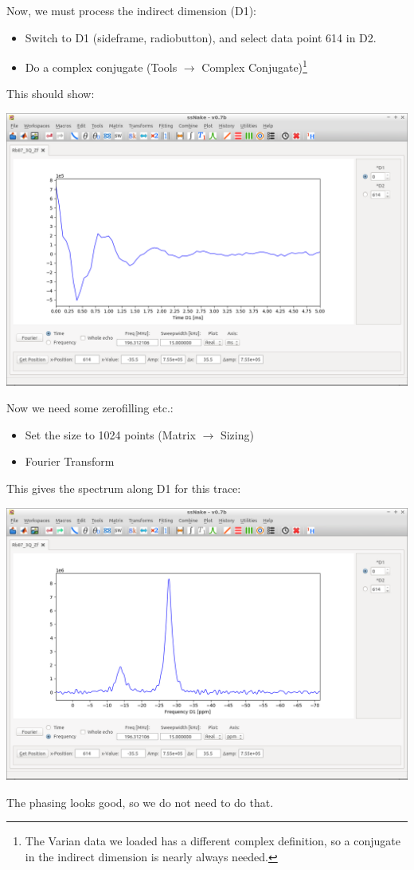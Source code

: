 \documentclass[11pt,a4paper]{article}
\begin{document}
Now, we must process the indirect dimension (D1):
\begin{itemize}
	\item Switch to D1 (sideframe, radiobutton), and select data point 614 in D2.
	\item Do a complex conjugate (Tools $\longrightarrow$ Complex Conjugate)\footnote{The Varian data
	  we loaded has a different complex definition, so a conjugate in the indirect dimension is
	nearly always needed.}
\end{itemize}
This should show:
\begin{center}
\includegraphics[width=0.8\linewidth]{Figs/Fig3.png}
\end{center}
Now we need some zerofilling etc.:
\begin{itemize}
	\item Set the size to 1024 points (Matrix $\longrightarrow$ Sizing)
	\item Fourier Transform
\end{itemize}
This gives the spectrum along D1 for this trace:
\begin{center}
\includegraphics[width=0.8\linewidth]{Figs/Fig4.png}
\end{center}
The phasing looks good, so we do not need to do that.
\end{document}
